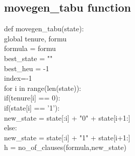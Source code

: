 \documentclass{article}
\begin{document}
\subsection*{movegen\_tabu function}
    \vspace{5pt}
    def movegen\_tabu(state):
    \vspace{5pt}
        \vspace{2pt}
        \\ \hspace*{20pt}global tenure, formu
        \vspace{2pt}
        \\ \hspace*{20pt}formula = formu
        \vspace{2pt}
        \\ \hspace*{20pt}best\_state = ""
        \vspace{2pt}
        \\ \hspace*{20pt}best\_heu = -1 
        \vspace{2pt}
        \\ \hspace*{20pt}index=-1
        \vspace{2pt}
        \\ \hspace*{20pt}for i in range(len(state)):
        \vspace{2pt}
        \\ \hspace*{30pt}if(tenure[i] == 0):
        \vspace{2pt}
        \\ \hspace*{40pt}if(state[i] == '1'):
        \vspace{2pt}
        \\ \hspace*{50pt}new\_state = state[:i] + "0" + state[i+1:]
        \vspace{2pt}
        \\ \hspace*{40pt}else:
        \vspace{2pt}
        \\ \hspace*{50pt}new\_state = state[:i] + "1" + state[i+1:]
        \vspace{2pt}
        \\ \hspace*{40pt}h = no\_of\_clauses(formula,new\_state)
\end{document}
